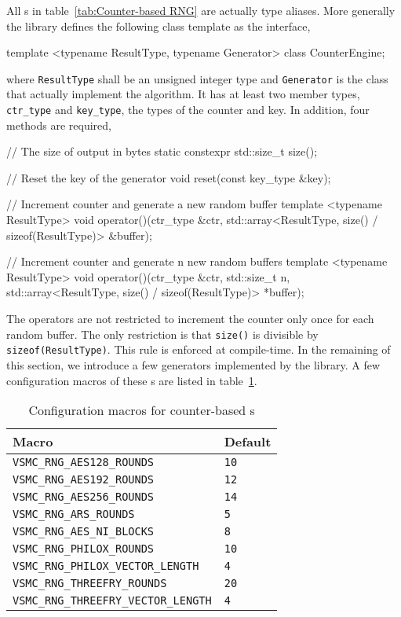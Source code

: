 All \rng{}s in table~\ref{tab:Counter-based RNG} are actually type aliases.
More generally the library defines the following class template as the
interface,
\begin{cppcode}
  template <typename ResultType, typename Generator>
  class CounterEngine;
\end{cppcode}
where \verb|ResultType| shall be an unsigned integer type and \verb|Generator|
is the class that actually implement the algorithm. It has at least two member
types, \verb|ctr_type| and \verb|key_type|, the types of the counter and key.
In addition, four methods are required,
\begin{cppcode}
  // The size of output in bytes
  static constexpr std::size_t size();

  // Reset the key of the generator
  void reset(const key_type &key);

  // Increment counter and generate a new random buffer
  template <typename ResultType>
  void operator()(ctr_type &ctr,
      std::array<ResultType, size() / sizeof(ResultType)> &buffer);

  // Increment counter and generate n new random buffers
  template <typename ResultType>
  void operator()(ctr_type &ctr, std::size_t n,
      std::array<ResultType, size() / sizeof(ResultType)> *buffer);
\end{cppcode}
The operators are not restricted to increment the counter only once for each
random buffer. The only restriction is that \verb|size()| is divisible by
\verb|sizeof(ResultType)|. This rule is enforced at compile-time. In the
remaining of this section, we introduce a few generators implemented by the
library. A few configuration macros of these \rng{}s are listed in
table~\ref{tab:Configuration macros for counter-based RNGs}.

\begin{table}
  \begin{tabularx}{\textwidth}{XX}
    \toprule
    Macro & Default \\
    \midrule
    \verb|VSMC_RNG_AES128_ROUNDS|          & \verb|10| \\
    \verb|VSMC_RNG_AES192_ROUNDS|          & \verb|12| \\
    \verb|VSMC_RNG_AES256_ROUNDS|          & \verb|14| \\
    \verb|VSMC_RNG_ARS_ROUNDS|             & \verb|5|  \\
    \verb|VSMC_RNG_AES_NI_BLOCKS|          & \verb|8|  \\
    \verb|VSMC_RNG_PHILOX_ROUNDS|          & \verb|10| \\
    \verb|VSMC_RNG_PHILOX_VECTOR_LENGTH|   & \verb|4|  \\
    \verb|VSMC_RNG_THREEFRY_ROUNDS|        & \verb|20| \\
    \verb|VSMC_RNG_THREEFRY_VECTOR_LENGTH| & \verb|4|  \\
    \bottomrule
  \end{tabularx}
  \caption{Configuration macros for counter-based \rng{}s}
  \label{tab:Configuration macros for counter-based RNGs}
\end{table}


